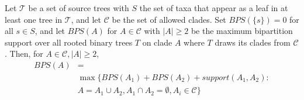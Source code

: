 \begin{theorem}
Let $\mathcal{T}$ be a set of source trees with
$S$ the set of taxa that appear as a leaf in at least
one tree in $\mathcal{T}$, and let $\mathcal{C}$ be the
set of allowed clades.
Set  $BPS(\{s\})=0$ for all $s \in S$, and
let $BPS(A)$ for $A \in \mathcal{C}$ with  $|A|\geq 2$ 
be the  maximum bipartition support over
all rooted binary trees $T$ on clade $A$ where $T$ draws
its clades from $\mathcal{C}$.
Then, for $A \in \mathcal{C}, |A|\geq 2$, 
\begin{align}
\label{fastrfs::eqn:thm2}
BPS(A) &= \nonumber  \\
& \max \{BPS(A_1)+BPS(A_2)+support(A_1,A_2): \nonumber\\
& A = A_1 \cup A_2, A_1 \cap A_2 = \emptyset, A_i \in \mathcal{C}\}
\end{align}
\label{fastrfs::theorem:why-dp}
\end{theorem}
